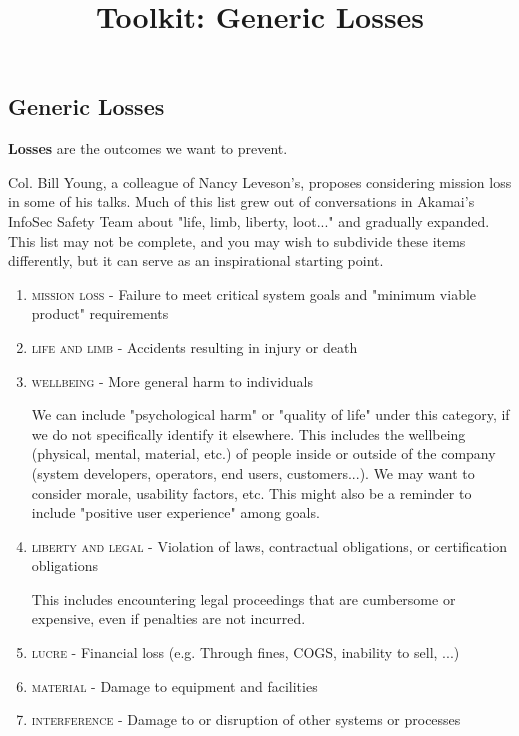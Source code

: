 \documentclass[a4paper]{tufte-book}
\title{Toolkit: Generic Losses}
\begin{document}
\setlength{\parindent}{0em}
\setlength{\parskip}{.75em}

\begin{fullwidth}

\section{Generic Losses}


\textbf{Losses} are the outcomes we want to prevent.


Col. Bill Young, a colleague of Nancy Leveson's, proposes considering mission loss in some of his talks.
Much of this list grew out of conversations in Akamai's InfoSec Safety Team about "life, limb, liberty, loot..." and gradually expanded. This list may not be complete, and you may wish to subdivide these items differently, but it can serve as an inspirational starting point.

\begin{enumerate}
\setlength{\itemsep}{0pt}
\setlength{\parskip}{.25em}

\item \textsc{mission loss} - Failure to meet critical system goals and "minimum viable product" requirements
\item \textsc{life and limb} - Accidents resulting in injury or death
\item \textsc{wellbeing} - More general harm to individuals

We can include "psychological harm" or "quality of life" under this category, if we do not specifically identify it elsewhere.
This includes the wellbeing (physical, mental, material, etc.) of people inside or outside of the company (system developers, operators, end users, customers...). We may want to consider morale, usability factors, etc. This might also be a reminder to include "positive user experience" among goals.
\item \textsc{liberty and legal} - Violation of laws, contractual obligations, or certification obligations

This includes encountering legal proceedings that are cumbersome or expensive, even if penalties are not incurred.
\item \textsc{lucre} - Financial loss (e.g. Through fines, COGS, inability to sell, ...)
\item \textsc{material} - Damage to equipment and facilities
\item \textsc{interference} -  Damage to or disruption of other systems or processes


\end{enumerate}
\end{fullwidth}
\end{document}
